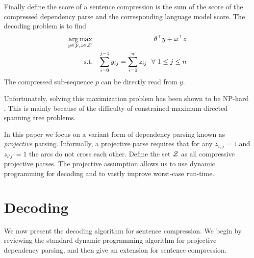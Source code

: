 \documentclass[11pt,a4paper]{article}
\DeclareMathOperator*{\argmax}{arg\,max}
\newcommand{\IndexSetB}{{\cal J}}
\begin{document}

Finally define the score of a sentence compression is the
sum of the score of the compressed dependency parse and the
corresponding language model score. The decoding problem is to find
\begin{eqnarray*}
 \argmax_{y \in {\cal Y}, z\in {\cal Z}'} &&\theta^\top y +  \omega^\top z \\
\mathrm{s.t.} &&  \sum_{i = 0}^{j-1} y_{i j} =  \sum_{i=0}^n z_{i j} \ \ \forall\  1 \leq j \leq n 
\end{eqnarray*}
\noindent The compressed sub-sequence $p$ can be directly read from $y$. 

Unfortunately, solving this maximization problem has been shown to be NP-hard \cite{}. This is mainly because of the difficulty of constrained maximum directed spanning tree problems.  

In this paper we focus on a variant form of dependency parsing known
as \textit{projective} parsing. Informally, a projective parse requires that for any $z_{i,j}=1$ and
$z_{i'j'}=1$ the arcs do not cross each other. Define the set ${\cal Z}$ as all compressive projective parses. 
The projective assumption allows us to use dynamic programming for decoding and to vastly improve worst-case
run-time.













\section{Decoding}


We now present the decoding algorithm for sentence compression. We begin by
reviewing the standard dynamic programming algorithm for projective
dependency parsing, and then give an extension for sentence 
compression.
\end{document}

